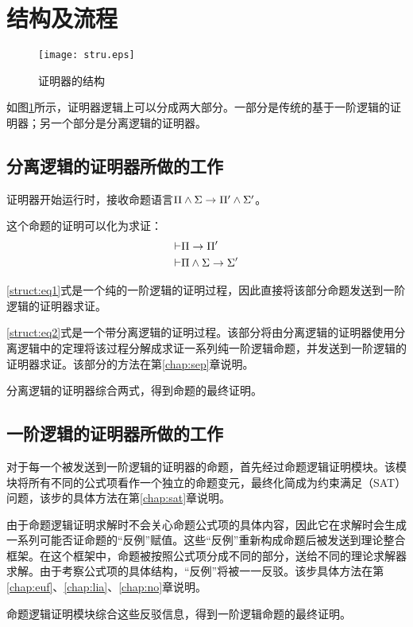 \section{结构及流程}

\begin{figure}[!htbp]
  \centering
  \texttt{[image: stru.eps]}
  \caption{证明器的结构}
  \label{struct:fig}
\end{figure}

如图\ref{struct:fig}所示，证明器逻辑上可以分成两大部分。一部分是传统的基于一阶逻辑的证明器；另一个部分是分离逻辑的证明器。

\subsection{分离逻辑的证明器所做的工作}
证明器开始运行时，接收命题语言$\Pi \land \Sigma \rightarrow \Pi' \land \Sigma'$。

这个命题的证明可以化为求证：
\begin{eqnarray}
  \vdash & \Pi \rightarrow \Pi' \label{struct:eq1}\\
  \vdash & \Pi \land \Sigma \rightarrow \Sigma' \label{struct:eq2}
\end{eqnarray}

\ref{struct:eq1}式是一个纯的一阶逻辑的证明过程，因此直接将该部分命题发送到一阶逻辑的证明器求证。

\ref{struct:eq2}式是一个带分离逻辑的证明过程。该部分将由分离逻辑的证明器使用分离逻辑中的定理将该过程分解成求证一系列纯一阶逻辑命题，并发送到一阶逻辑的证明器求证。该部分的方法在第\ref{chap:sep}章说明。

分离逻辑的证明器综合两式，得到命题的最终证明。

\subsection{一阶逻辑的证明器所做的工作}
对于每一个被发送到一阶逻辑的证明器的命题，首先经过命题逻辑证明模块。该模块将所有不同的公式项看作一个独立的命题变元，最终化简成为约束满足（SAT）问题，该步的具体方法在第\ref{chap:sat}章说明。

由于命题逻辑证明求解时不会关心命题公式项的具体内容，因此它在求解时会生成一系列可能否证命题的``反例''赋值。这些``反例''重新构成命题后被发送到理论整合框架。在这个框架中，命题被按照公式项分成不同的部分，送给不同的理论求解器求解。由于考察公式项的具体结构，``反例''将被一一反驳。该步具体方法在第\ref{chap:euf}、\ref{chap:lia}、\ref{chap:no}章说明。

命题逻辑证明模块综合这些反驳信息，得到一阶逻辑命题的最终证明。
